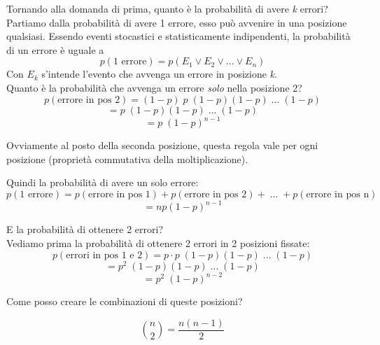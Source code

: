 Tornando alla domanda di prima, quanto è la probabilità di avere \textit{k} errori?\\
Partiamo dalla probabilità di avere 1 errore, esso può avvenire in una posizione qualsiasi.
Essendo eventi stocastici e statisticamente indipendenti, la probabilità di un errore è uguale a
\begin{equation}
p(\text{1 errore}) = p(E_1 \lor E_2 \lor ... \lor E_n)
\end{equation}
Con $E_k$ s'intende l'evento che avvenga un errore in posizione \textit{k}.\\
Quanto è la probabilità che avvenga un errore \textit{solo} nella posizione 2?
\begin{equation}
p(\text{errore in pos 2}) = (1-p) \; p \; (1-p)(1-p) \; ... \; (1-p)
\end{equation}
\begin{equation*}
= p \; (1-p)(1-p) \; ... \; (1-p)
\end{equation*}
\begin{equation*}
= p \; (1-p)^{n-1}
\end{equation*}

Ovviamente al posto della seconda posizione, questa regola vale per ogni posizione (proprietà commutativa della moltiplicazione).

Quindi la probabilità di avere un solo errore:
\begin{equation}
p(\text{1 errore}) = p(\text{errore in pos 1}) + p(\text{errore in pos 2}) + \; ... \; + p(\text{errore in pos n})
\end{equation}
\begin{equation*}
= np(1-p)^{n-1}
\end{equation*}

E la probabilità di ottenere 2 errori?\\
Vediamo prima la probabilità di ottenere 2 errori in 2 posizioni fissate:
\begin{equation}
p(\text{errori in pos 1 e 2}) = p \cdot p \; (1-p)(1-p) \; ... \; (1-p)
\end{equation}
\begin{equation*}
= p^2 \; (1-p)(1-p) \; ... \; (1-p)
\end{equation*}
\begin{equation*}
= p^2 \; (1-p)^{n-2}
\end{equation*}

Come posso creare le combinazioni di queste posizioni?

\begin{equation}
\binom{n}{2} = \frac{n(n-1)}{2}
\end{equation}

